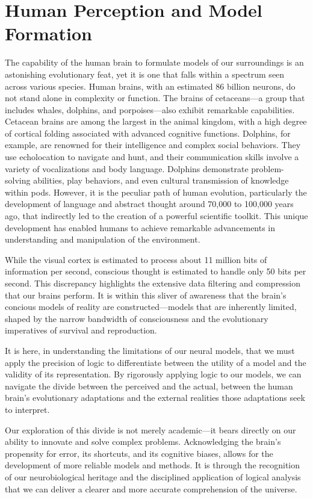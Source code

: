 \documentclass[12pt]{article}
\begin{document}
\section*{Human Perception and Model Formation}
The capability of the human brain to formulate models of our surroundings is an astonishing evolutionary feat, yet it is one that falls within a spectrum seen across various species. Human brains, with an estimated 86 billion neurons, do not stand alone in complexity or function. The brains of cetaceans—a group that includes whales, dolphins, and porpoises—also exhibit remarkable capabilities. Cetacean brains are among the largest in the animal kingdom, with a high degree of cortical folding associated with advanced cognitive functions. Dolphins, for example, are renowned for their intelligence and complex social behaviors. They use echolocation to navigate and hunt, and their communication skills involve a variety of vocalizations and body language. Dolphins demonstrate problem-solving abilities, play behaviors, and even cultural transmission of knowledge within pods. However, it is the peculiar path of human evolution, particularly the development of language and abstract thought around 70,000 to 100,000 years ago, that indirectly led to the creation of a powerful scientific toolkit. This unique development has enabled humans to achieve remarkable advancements in understanding and manipulation of the environment.

While the visual cortex is estimated to process about 11 million bits of information per second, conscious thought is estimated to handle only 50 bits per second. This discrepancy highlights the extensive data filtering and compression that our brains perform. It is within this sliver of awareness that the brain's concious models of reality are constructed—models that are inherently limited, shaped by the narrow bandwidth of consciousness and the evolutionary imperatives of survival and reproduction.

It is here, in understanding the limitations of our neural models, that we must apply the precision of logic to differentiate between the utility of a model and the validity of its representation. By rigorously applying logic to our models, we can navigate the divide between the perceived and the actual, between the human brain's evolutionary adaptations and the external realities those adaptations seek to interpret.

Our exploration of this divide is not merely academic—it bears directly on our ability to innovate and solve complex problems. Acknowledging the brain's propensity for error, its shortcuts, and its cognitive biases, allows for the development of more reliable models and methods. It is through the recognition of our neurobiological heritage and the disciplined application of logical analysis that we can deliver a clearer and more accurate comprehension of the universe.
\end{document}
